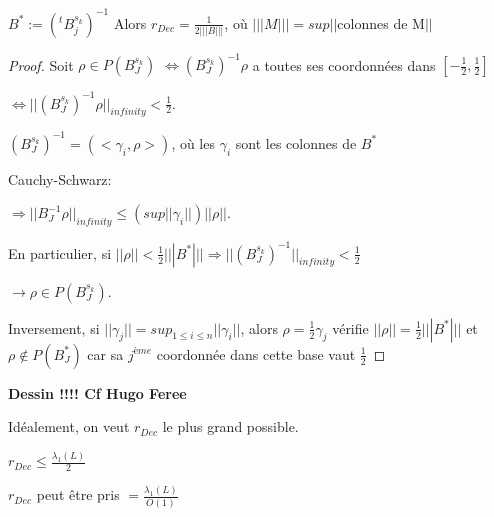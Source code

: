 \begin{proposition}
$B^* := (^t B_j^{s_k})^{-1}$
Alors $r_{Dec}= \frac{1}{2 ||| B |||}$, où $|||M|||= sup ||$colonnes de M$||$
\end{proposition}

\begin{proof}
Soit $\rho \in P(B_J^{s_k})$
$\Leftrightarrow (B_J^{s_k})^{-1} \rho$ a toutes ses coordonnées dans $[- \frac{1}{2},\frac{1}{2}]$

$\Leftrightarrow ||(B_J^{s_k})^{-1} \rho||_{infinity} < \frac{1}{2}$.

$(B_J^{s_k})^{-1}=(<\gamma_i,\rho>)$, où les $\gamma_i$ sont les colonnes de $B^*$

Cauchy-Schwarz:

$\Rightarrow ||B_J^{-1} \rho||_{infinity} \leq (sup || \gamma_i ||) ||\rho||$.

En particulier, si $||\rho|| < \frac{1}{2} ||| B^* ||| \Rightarrow ||(B_J^{s_k})^{-1}||_{infinity} < \frac{1}{2}$

$\rightarrow \rho \in P(B_J^{s_k})$.

Inversement, si $||\gamma_j||= sup_{1 \leq i \leq n} ||\gamma_i||$, alors $\rho=\frac{1}{2} \gamma_j$ vérifie $|| \rho || = \frac{1}{2} |||B^*|||$ et $\rho \not\in P(B_J^*)$ car sa $j^{ème}$ coordonnée dans cette base vaut $\frac{1}{2}$
\end{proof}

\textbf{Dessin !!!! Cf Hugo Feree}

Idéalement, on veut $r_{Dec}$ le plus grand possible.

$r_{Dec} \leq \frac{\lambda_1(L)}{2}$

\begin{proposition}
$r_{Dec}$ peut être pris $= \frac{\lambda_1(L)}{O(1)}$
\end{proposition}

